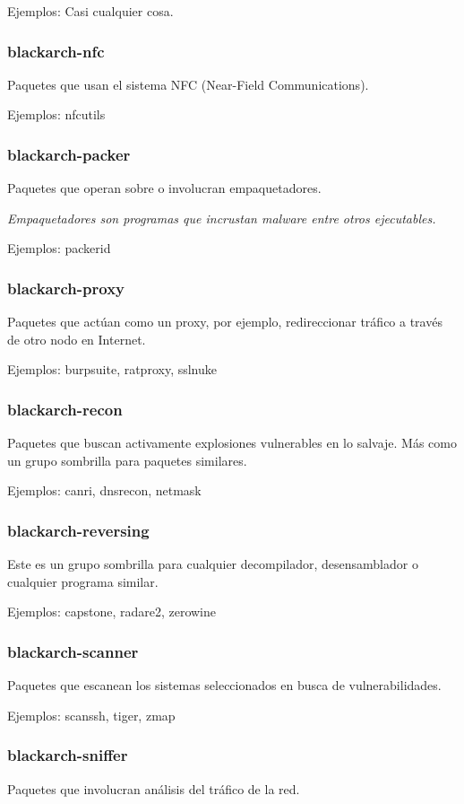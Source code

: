 \documentclass[a4paper, oneside, 11pt]{book}
\begin{document}
Ejemplos: Casi cualquier cosa.

\subsubsection{blackarch-nfc}
Paquetes que usan el sistema NFC (Near-Field Communications).

Ejemplos: nfcutils

\subsubsection{blackarch-packer}
Paquetes que operan sobre o involucran empaquetadores.

\textit{Empaquetadores son programas que incrustan malware entre otros ejecutables.}

Ejemplos: packerid

\subsubsection{blackarch-proxy}
Paquetes que actúan como un proxy, por ejemplo, redireccionar tráfico
a través de otro nodo en Internet.

Ejemplos: burpsuite, ratproxy, sslnuke

\subsubsection{blackarch-recon}
Paquetes que buscan activamente explosiones vulnerables en lo 
salvaje. Más como un grupo sombrilla para paquetes similares.

Ejemplos: canri, dnsrecon, netmask

\subsubsection{blackarch-reversing}
Este es un grupo sombrilla para cualquier decompilador,
desensamblador o cualquier programa similar.

Ejemplos: capstone, radare2, zerowine

\subsubsection{blackarch-scanner}
Paquetes que escanean los sistemas seleccionados en busca de vulnerabilidades.

Ejemplos: scanssh, tiger, zmap

\subsubsection{blackarch-sniffer}
Paquetes que involucran análisis del tráfico de la red.
\end{document}
